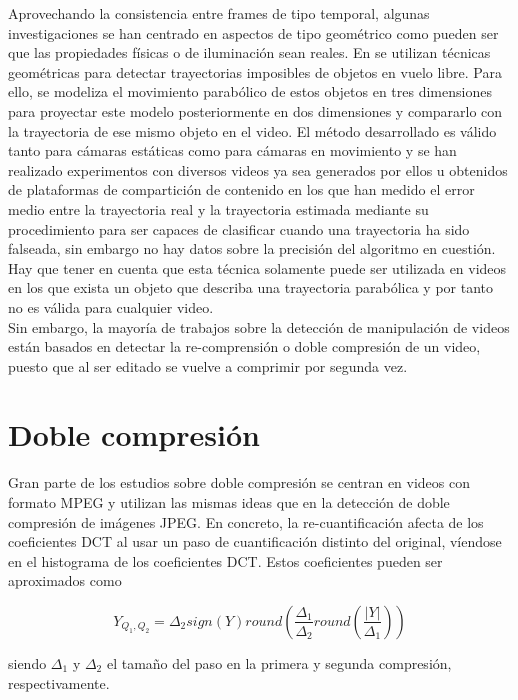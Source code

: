 Aprovechando la consistencia entre frames de tipo temporal, algunas investigaciones se han centrado en aspectos de tipo geométrico como pueden ser que las propiedades físicas o de iluminación sean reales. En \cite{conotter:2011} se utilizan técnicas geométricas para detectar trayectorias imposibles de objetos en vuelo libre. Para ello, se modeliza el movimiento parabólico de estos objetos en tres dimensiones para proyectar este modelo posteriormente en dos dimensiones y compararlo con la trayectoria de ese mismo objeto en el video. El método desarrollado es válido tanto para cámaras estáticas como para cámaras en movimiento y se han realizado experimentos con diversos videos ya sea generados por ellos u obtenidos de plataformas de compartición de contenido en los que han medido el error medio entre la trayectoria real y la trayectoria estimada mediante su procedimiento para ser capaces de clasificar cuando una trayectoria ha sido falseada, sin embargo no hay datos sobre la precisión del algoritmo en cuestión. Hay que tener en cuenta que esta técnica solamente puede ser utilizada en videos en los que exista un objeto que describa una trayectoria parabólica y por tanto no es válida para cualquier video. \\

Sin embargo, la mayoría de trabajos sobre la detección de manipulación de videos están basados en detectar la re-comprensión o doble compresión de un video, puesto que al ser editado se vuelve a comprimir por segunda vez. 

\section{Doble compresión}
Gran parte de los estudios sobre doble compresión se centran en videos con formato MPEG y utilizan las mismas ideas que en la detección de doble compresión de imágenes JPEG. En concreto, la re-cuantificación afecta de los coeficientes DCT al usar un paso de cuantificación distinto del original, víendose en el histograma de los coeficientes DCT\cite{bestagini:2012}. Estos coeficientes pueden ser aproximados como\cite{fridrich:1998}

\begin{equation}
Y_{Q_1, Q_2} = \Delta_{2} sign(Y)round\left(\frac{\Delta_1}{\Delta_2}round\left(\frac{|Y|}{\Delta_1}\right)\right) \nonumber
\end{equation}

siendo $\Delta_1$ y $\Delta_2$ el tama\~no del paso en la primera y segunda compresión, respectivamente.

